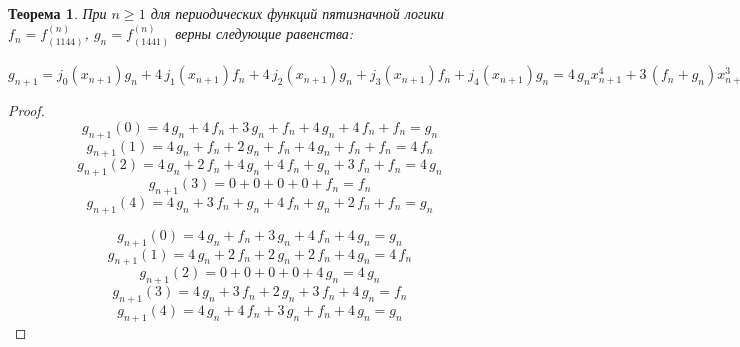 \documentclass[a4paper, 14pt]{extarticle}
\newtheorem{myth}{Теорема}
\begin{document}
\begin{myth} При $n \geqslant 1 $ для периодических функций пятизначной логики $f_n = f^{\left(n\right)}_{\left(1144\right)}$,
$g_n = f^{\left(n\right)}_{\left(1441\right)}$ верны следующие равенства:
\end{myth}$ g_{n+1} = j_0(x_{n+1})g_n + 4\,j_1(x_{n+1})f_n + 4\,j_2(x_{n+1})g_n + j_3(x_{n+1})f_n + j_4(x_{n+1})g_n = 4 \, g_{n} x_{n+1}^{4} + 3 \, {\left(f_{n} + g_{n}\right)} x_{n+1}^{3} + {\left(2 \, f_{n} + 3 \, g_{n}\right)} x_{n+1}^{2} + 4 \, {\left(f_{n} + g_{n}\right)} x_{n+1} + g_{n}
 = 4 \, g_{n} {\left(x_{n+1} + 1\right)}^{4} + {\left(3 \, f_{n} + 2 \, g_{n}\right)} {\left(x_{n+1} + 1\right)}^{3} + 3 \, {\left(f_{n} + g_{n}\right)} {\left(x_{n+1} + 1\right)}^{2} + {\left(4 \, f_{n} + g_{n}\right)} {\left(x_{n+1} + 1\right)} + g_{n}
 = 4 \, g_{n} {\left(x_{n+1} + 2\right)}^{4} + {\left(3 \, f_{n} + g_{n}\right)} {\left(x_{n+1} + 2\right)}^{3} + {\left(4 \, f_{n} + g_{n}\right)} {\left(x_{n+1} + 2\right)}^{2} + 2 \, f_{n} {\left(x_{n+1} + 2\right)} + f_{n}
 = 4 \, g_{n} {\left(x_{n+1} + 3\right)}^{4} + 3 \, f_{n} {\left(x_{n+1} + 3\right)}^{3} + 2 \, g_{n} {\left(x_{n+1} + 3\right)}^{2} + 3 \, f_{n} {\left(x_{n+1} + 3\right)} + 4 \, g_{n}
 = 4 \, g_{n} {\left(x_{n+1} + 4\right)}^{4} + {\left(3 \, f_{n} + 4 \, g_{n}\right)} {\left(x_{n+1} + 4\right)}^{3} + {\left(f_{n} + g_{n}\right)} {\left(x_{n+1} + 4\right)}^{2} + 2 \, f_{n} {\left(x_{n+1} + 4\right)} + 4 \, f_{n}
$
\begin{proof}
$$g_{n+1}(0) = 4\,g_n + 4\,f_n + 3\,g_n + f_n + 4\,g_n + 4\,f_n + f_n = g_n$$
$$g_{n+1}(1) = 4\,g_n + f_n + 2\,g_n + f_n + 4\,g_n + f_n + f_n = 4\,f_n$$
$$g_{n+1}(2) = 4\,g_n + 2\,f_n + 4\,g_n + 4\,f_n + g_n + 3\,f_n + f_n = 4\,g_n$$
$$g_{n+1}(3) = 0 + 0 + 0 + 0 + f_n = f_n$$
$$g_{n+1}(4) = 4\,g_n + 3\,f_n + g_n + 4\,f_n + g_n + 2\,f_n + f_n = g_n$$

$$g_{n+1}(0) = 4\,g_n + f_n + 3\,g_n + 4\,f_n + 4\,g_n = g_n$$
$$g_{n+1}(1) = 4\,g_n + 2\,f_n + 2\,g_n + 2\,f_n + 4\,g_n = 4\,f_n$$
$$g_{n+1}(2) = 0 + 0 + 0 + 0 + 4\,g_n = 4\,g_n$$
$$g_{n+1}(3) = 4\,g_n + 3\,f_n + 2\,g_n + 3\,f_n + 4\,g_n = f_n$$
$$g_{n+1}(4) = 4\,g_n + 4\,f_n + 3\,g_n + f_n + 4\,g_n = g_n$$


\end{proof}
\end{document}
